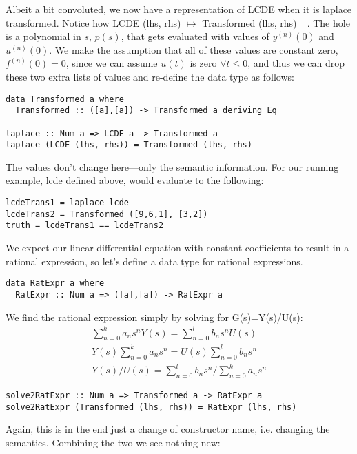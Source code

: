 Albeit a bit convoluted, we now have a representation of LCDE when it is laplace transformed.
Notice how LCDE (lhs, rhs) $\mapsto$ Transformed (lhs, rhs) \_. The hole is a polynomial in $s$, $p(s)$, that gets evaluated with values of $y^{(n)}(0)$ and $u^{(n)}(0)$. We make the assumption that all of these values are constant zero, $f^{(n)}(0)=0$, since we can assume $u(t)$ is zero $\forall t\leq 0$, and thus we can drop these two extra lists of values and re-define the data type as follows:

\begin{verbatim}
data Transformed a where
  Transformed :: ([a],[a]) -> Transformed a deriving Eq

laplace :: Num a => LCDE a -> Transformed a
laplace (LCDE (lhs, rhs)) = Transformed (lhs, rhs)
\end{verbatim}

The values don't change here---only the semantic information.
For our running example, lcde defined above, would evaluate to the following:
\begin{verbatim}
lcdeTrans1 = laplace lcde
lcdeTrans2 = Transformed ([9,6,1], [3,2])
truth = lcdeTrans1 == lcdeTrans2
\end{verbatim}

We expect our linear differential equation with constant coefficients to result
in a rational expression, so let's define a data type for rational expressions.

\begin{verbatim}
data RatExpr a where
  RatExpr :: Num a => ([a],[a]) -> RatExpr a
\end{verbatim}

We find the rational expression simply by solving for G(s)=Y(s)/U(s):
\begin{gather}
\sum\limits^{k}_{n=0}{a_n s^n Y(s)} = \sum\limits^{l}_{n=0}{b_n s^n U(s)}\\
Y(s)\sum\limits^{k}_{n=0}{a_n s^n} = U(s)\sum\limits^{l}_{n=0}{b_n s^n}\\
Y(s)/U(s) = \sum\limits^{l}_{n=0}{b_n s^n}/\sum\limits^{k}_{n=0}{a_n s^n}
\end{gather}

\begin{verbatim}
solve2RatExpr :: Num a => Transformed a -> RatExpr a
solve2RatExpr (Transformed (lhs, rhs)) = RatExpr (lhs, rhs)
\end{verbatim}

Again, this is in the end just a change of constructor name, i.e. changing the %
semantics. Combining the two we see nothing new:


